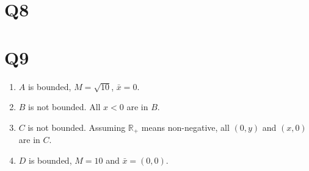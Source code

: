 \documentclass{article}
\begin{document}
\section*{Q8}



\section*{Q9}

\begin{enumerate}
\item $A$ is bounded, $M=\sqrt{10}$, $\bar{x}=0$.

\item $B$ is not bounded. All $x<0$ are in $B$.

\item $C$ is not bounded. Assuming $\mathbb{R}_+$ means non-negative, all
$(0,y)$ and $(x,0)$ are in $C$.

\item $D$ is bounded, $M=10$ and $\bar{x}=(0,0)$.
\end{enumerate}
\end{document}
